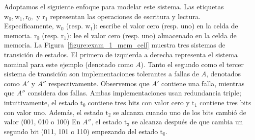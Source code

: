 \begin{example}
Adoptamos el siguiente enfoque para modelar este sistema. Las etiquetas $\text{w}_0, \text{w}_1, \text{r}_0,$ y $\text{r}_1$
representan las operaciones de escritura y lectura. Específicamente, $\text{w}_0$ (resp. $\text{w}_1$): escribe el valor cero (resp. uno) en la celda de memoria. $\text{r}_0$ (resp. $\text{r}_1$): lee el valor cero (resp. uno) almacenado en la celda de memoria.
La Figura~\ref{figure:exam_1_mem_cell} muestra tres sistemas de transición de estados. El primero de izquierda a derecha representa el sistema nominal para este ejemplo (denotado como $A$).
Tanto el segundo como el tercer sistema de transición son implementaciones tolerantes a fallas de $A$, denotados como $A'$ y $A''$ respectivamente. Observemos que $A'$ contiene una falla, mientras que $A''$ considera dos fallas. Ambas implementaciones usan redundancia triple; intuitivamente, el estado $\text{t}_0$ contiene tres bits con valor cero y $\text{t}_1$ contiene tres bits con valor uno.
Además, el estado $\text{t}_2$ se alcanza cuando uno de los bits cambió de valor (001, 010 o 100)
En  $A''$, el estado $\text{t}_3$ se alcanza después de que cambia un segundo bit (011, 101 o 110) empezando del estado $\text{t}_0$.
\begin{figure}[ht] 
\begin{center}
  \begin{subfigure}{.26\textwidth}\centering
\end{subfigure}
\end{center}
\end{figure}
\end{example}
